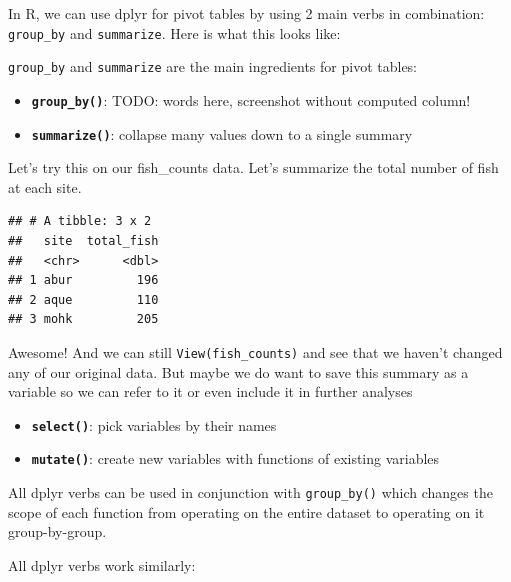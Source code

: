 \documentclass[]{book}
\newenvironment{Shaded}{\begin{snugshade}}{\end{snugshade}}
\newcommand{\DataTypeTok}[1]{\textcolor[rgb]{0.13,0.29,0.53}{#1}}
\newcommand{\KeywordTok}[1]{\textcolor[rgb]{0.13,0.29,0.53}{\textbf{#1}}}
\newcommand{\NormalTok}[1]{#1}
\newcommand{\OperatorTok}[1]{\textcolor[rgb]{0.81,0.36,0.00}{\textbf{#1}}}
\newcommand{\StringTok}[1]{\textcolor[rgb]{0.31,0.60,0.02}{#1}}
\begin{document}
In R, we can use dplyr for pivot tables by using 2 main verbs in combination: \texttt{group\_by} and \texttt{summarize}. Here is what this looks like:

\texttt{group\_by} and \texttt{summarize} are the main ingredients for pivot tables:

\begin{itemize}
\item
  \textbf{\texttt{group\_by()}}: TODO: words here, screenshot without computed column!
\item
  \textbf{\texttt{summarize()}}: collapse many values down to a single summary
\end{itemize}

Let's try this on our fish\_counts data. Let's summarize the total number of fish at each site.

\begin{Shaded}
\end{Shaded}

\begin{verbatim}
## # A tibble: 3 x 2
##   site  total_fish
##   <chr>      <dbl>
## 1 abur         196
## 2 aque         110
## 3 mohk         205
\end{verbatim}

Awesome! And we can still \texttt{View(fish\_counts)} and see that we haven't changed any of our original data. But maybe we do want to save this summary as a variable so we can refer to it or even include it in further analyses

\begin{itemize}
\item
  \textbf{\texttt{select()}}: pick variables by their names
\item
  \textbf{\texttt{mutate()}}: create new variables with functions of existing variables
\end{itemize}

All dplyr verbs can be used in conjunction with \texttt{group\_by()} which changes the scope of each function from operating on the entire dataset to operating on it group-by-group.

All dplyr verbs work similarly:
\end{document}
